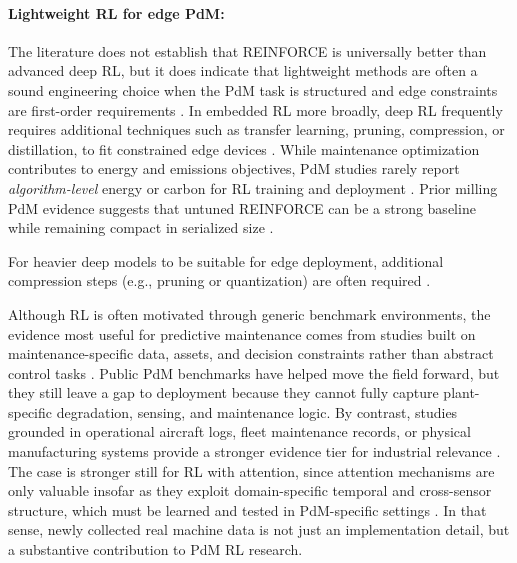 \documentclass[sn-basic]{sn-jnl} %
\begin{document}
\paragraph{Lightweight RL for edge PdM:}
The literature does not establish that REINFORCE is universally better than advanced deep RL, but it does indicate that lightweight methods are often a sound engineering choice when the PdM task is structured and edge constraints are first-order requirements \cite{Compare2020, Njor2024, Pandey2023}. In embedded RL more broadly, deep RL frequently requires additional techniques such as transfer learning, pruning, compression, or distillation, to fit constrained edge devices \cite{Jang2020, Szydlo2022, Xu2022}.
While maintenance optimization contributes to energy and emissions objectives, PdM studies rarely report \emph{algorithm-level} energy or carbon for RL training and deployment \cite{Banyai2021, Banyai2022, JasiulewiczKaczmarek2024}. Prior milling PdM evidence suggests that untuned \textsc{REINFORCE} can be a strong baseline while remaining compact in serialized size \cite{Siraskar2025}.


For heavier deep models to be suitable for edge deployment, additional compression steps (e.g., pruning or quantization) are often required \cite{Pandey2023, Jang2020, Xu2022}.

Although RL is often motivated through generic benchmark environments, the evidence most useful for predictive maintenance comes from studies built on maintenance-specific data, assets, and decision constraints rather than abstract control tasks \cite{Andrade2021Aircraft,Dangut2022RareFailure,Zhao2024,Siraskar2025}. Public PdM benchmarks have helped move the field forward, but they still leave a gap to deployment because they cannot fully capture plant-specific degradation, sensing, and maintenance logic. By contrast, studies grounded in operational aircraft logs, fleet maintenance records, or physical manufacturing systems provide a stronger evidence tier for industrial relevance \cite{Andrade2021Aircraft,Dangut2022RareFailure,Chen2024DigitalTwin}. The case is stronger still for RL with attention, since attention mechanisms are only valuable insofar as they exploit domain-specific temporal and cross-sensor structure, which must be learned and tested in PdM-specific settings \cite{Zhao2024}. In that sense, newly collected real machine data is not just an implementation detail, but a substantive contribution to PdM RL research.
\end{document}
